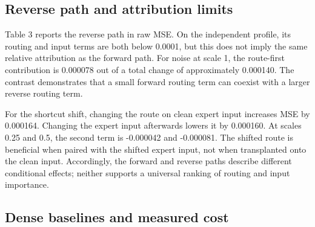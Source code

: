 \documentclass[10pt,letterpaper]{article}
\begin{document}
\subsection{Reverse path and attribution limits}

Table 3 reports the reverse path in raw MSE. On the independent profile, its routing and input terms are both below 0.0001, but this does not imply the same relative attribution as the forward path. For noise at scale 1, the route-first contribution is 0.000078 out of a total change of approximately 0.000140. The contrast demonstrates that a small forward routing term can coexist with a larger reverse routing term.


\begin{table}[!htbp]
\centering
\caption{Reverse-path means at scale 1, in raw MSE. The routing term changes the route on clean expert input; the input term then changes the expert input under that route.}
\label{tab:results3}
\small
\setlength{\tabcolsep}{4pt}
\renewcommand{\arraystretch}{1.1}
\ifdim\wd\reporttablebox>\linewidth
\resizebox{\linewidth}{!}{\usebox{\reporttablebox}}
\else\usebox{\reporttablebox}\fi
\end{table}


For the shortcut shift, changing the route on clean expert input increases MSE by 0.000164. Changing the expert input afterwards lowers it by 0.000160. At scales 0.25 and 0.5, the second term is -0.000042 and -0.000081. The shifted route is beneficial when paired with the shifted expert input, not when transplanted onto the clean input. Accordingly, the forward and reverse paths describe different conditional effects; neither supports a universal ranking of routing and input importance.


\subsection{Dense baselines and measured cost}
\end{document}
